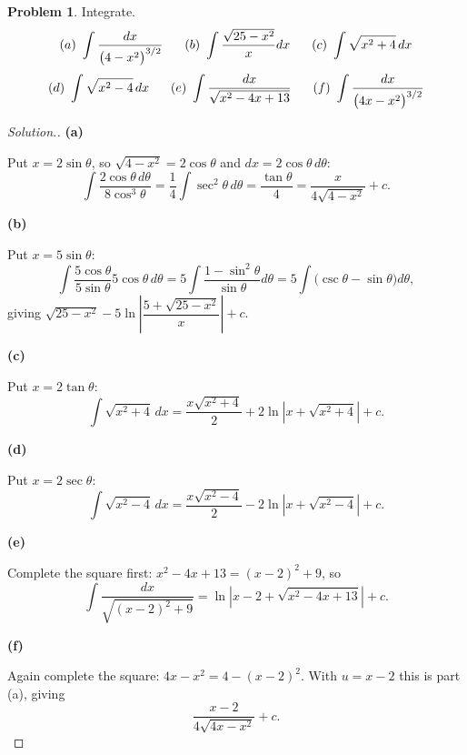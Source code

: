 \documentclass[11pt,a4paper]{article}
\theoremstyle{definition}
\newtheorem{problemx}{Problem}[subsection]
\newenvironment{problem}{\begin{problemx}}{\end{problemx}}
\newenvironment{solution}
  {\renewcommand{\qedsymbol}{}\begin{proof}[\textit{Solution}.]}
  {\end{proof}}
\newcommand{\subhead}[1]{%
  \par\medskip\noindent\textbf{#1}\par\nobreak\smallskip}
\begin{document}
\begin{problem}
Integrate.
$$(a)\ \int\frac{dx}{\big(4-x^2\big)^{3/2}}\hspace{0.6cm}
(b)\ \int\frac{\sqrt{25-x^2}}{x}dx\hspace{0.6cm}
(c)\ \int\sqrt{x^2+4}\,dx$$
$$(d)\ \int\sqrt{x^2-4}\,dx\hspace{0.6cm}
(e)\ \int\frac{dx}{\sqrt{x^2-4x+13}}\hspace{0.6cm}
(f)\ \int\frac{dx}{\big(4x-x^2\big)^{3/2}}$$
\end{problem}
\begin{solution}
\subhead{(a)} Put $x = 2\sin\theta$, so $\sqrt{4-x^2} = 2\cos\theta$ and
$dx = 2\cos\theta\,d\theta$:
$$\int\frac{2\cos\theta\,d\theta}{8\cos^3\theta}
= \frac14\int\sec^2\theta\,d\theta = \frac{\tan\theta}{4}
= \frac{x}{4\sqrt{4-x^2}} + c .$$

\subhead{(b)} Put $x = 5\sin\theta$:
$$\int\frac{5\cos\theta}{5\sin\theta}5\cos\theta\,d\theta
= 5\int\frac{1-\sin^2\theta}{\sin\theta}d\theta
= 5\int\big(\csc\theta - \sin\theta\big)d\theta ,$$
giving $\sqrt{25-x^2} - 5\ln\left|\dfrac{5+\sqrt{25-x^2}}{x}\right| + c$.

\subhead{(c)} Put $x = 2\tan\theta$:
$$\int\sqrt{x^2+4}\,dx = \frac{x\sqrt{x^2+4}}{2}
+ 2\ln\left|x+\sqrt{x^2+4}\right| + c .$$

\subhead{(d)} Put $x = 2\sec\theta$:
$$\int\sqrt{x^2-4}\,dx = \frac{x\sqrt{x^2-4}}{2}
- 2\ln\left|x+\sqrt{x^2-4}\right| + c .$$

\subhead{(e)} Complete the square first:
$x^2-4x+13 = (x-2)^2+9$, so
$$\int\frac{dx}{\sqrt{(x-2)^2+9}}
= \ln\left|x-2+\sqrt{x^2-4x+13}\right| + c .$$

\subhead{(f)} Again complete the square:
$4x-x^2 = 4-(x-2)^2$. With $u = x-2$ this is part (a), giving
$$\frac{x-2}{4\sqrt{4x-x^2}} + c .$$
\end{solution}
\end{document}
